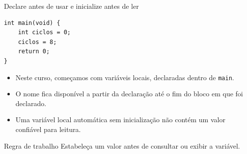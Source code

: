 \begin{frame}[fragile]{Declare antes de usar e inicialize antes de ler}
\begin{lstlisting}
int main(void) {
    int ciclos = 0;
    ciclos = 8;
    return 0;
}
\end{lstlisting}
\begin{itemize}
\item Neste curso, começamos com variáveis locais, declaradas dentro de \texttt{main}.
\item O nome fica disponível a partir da declaração até o fim do bloco em que foi declarado.
\item Uma variável local automática sem inicialização não contém um valor confiável para leitura.
\end{itemize}
\begin{alertblock}{Regra de trabalho}
Estabeleça um valor antes de consultar ou exibir a variável.
\end{alertblock}
\end{frame}
